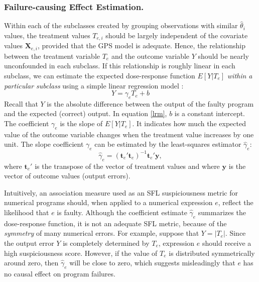 \documentclass[times]{stvrauth}
\begin{document}
\subsubsection{Failure-causing Effect Estimation.}
Within each of the subclasses created by grouping observations with similar $\hat \theta_i$ values, the treatment values $T_{e,i}$ should be largely independent of the covariate values $\pmb{X}_{e,i}$, provided that the GPS model is adequate. Hence, the relationship between the treatment variable $T_e$ and the outcome variable $Y$ should be nearly unconfounded in each subclass. If this relationship is roughly linear in each subclass, we can estimate the expected dose-response function $E[Y|T_e]$ {\it within a particular subclass} using a simple linear regression model \cite{Zhao2013}:
\begin{equation}\label{lrm}
Y=\gamma_eT_e+b
\end{equation}
Recall that $Y$ is the absolute difference between the output of the faulty program and the expected (correct) output. In equation \eqref{lrm}, $b$ is a constant intercept. The coefficient $\gamma_e$ is the slope of $E[Y|T_e]$. It indicates how much the expected value of the outcome variable changes when the treatment value increases by one unit. The slope coefficient $\gamma_e$ can be estimated by the least-squares estimator $\hat \gamma_e$:
\begin{equation}\label{ls}
\hat \gamma_e=({\pmb t}_e'{\pmb t}_e)^{-1}{\pmb t}_e'{\pmb y},
\end{equation}
where $\pmb{t}_e'$ is the transpose of the vector of treatment values and where $\pmb y$ is the vector of outcome values (output errors).

Intuitively, an association measure used as an SFL suspiciousness metric for numerical programs should, when applied to a numerical expression $e$, reflect the likelihood that $e$ is faulty.  Although the coefficient estimate $\hat \gamma_e$ summarizes the dose-response function, it is not an adequate SFL metric, because of the {\it symmetry} of many numerical errors. For example, suppose that $Y=|T_e |$.  Since the output error $Y$ is completely determined by $T_e$, expression $e$ should receive a high suspiciousness score. However, if the value of $T_e$ is distributed symmetrically around zero, then $\hat \gamma_e$ will be close to zero, which suggests misleadingly that $e$ has no causal effect on program failures.
\end{document}

